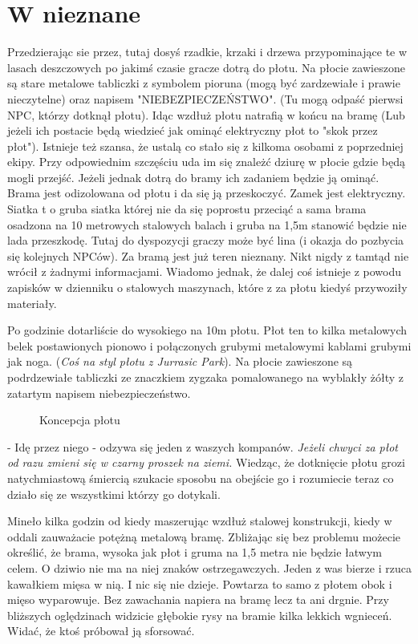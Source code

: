 \documentclass{article}
\begin{document}
    \section{W nieznane}

    Przedzierając sie przez, tutaj dosyś rzadkie, krzaki i drzewa przypominające te w lasach deszczowych po jakimś czasie gracze dotrą do płotu. Na płocie zawieszone są stare metalowe tabliczki z symbolem pioruna (mogą być zardzewiałe i prawie nieczytelne) oraz napisem "NIEBEZPIECZEŃSTWO". (Tu mogą odpaść pierwsi NPC, którzy dotknął płotu). Idąc wzdłuż płotu natrafią w końcu na bramę (Lub jeżeli ich postacie będą wiedzieć jak ominąć elektryczny płot to "skok przez płot"). Istnieje też szansa, że ustalą co stało się z kilkoma osobami z poprzedniej ekipy. Przy odpowiednim szczęściu uda im się znależć dziurę w płocie gdzie będą mogli przejść. Jeżeli jednak dotrą do bramy ich zadaniem będzie ją ominąć. Brama jest odizolowana od płotu i da się ją przeskoczyć. Zamek jest elektryczny. Siatka t o gruba siatka której nie da się poprostu przeciąć a sama brama osadzona na 10 metrowych stalowych balach i gruba na 1,5m stanowić będzie nie lada przeszkodę. Tutaj do dyspozycji graczy może być lina (i okazja do pozbycia się kolejnych NPCów). Za bramą jest już teren nieznany. Nikt nigdy z tamtąd nie wrócił z żadnymi informacjami. Wiadomo jednak, że dalej coś istnieje z powodu zapisków w dzienniku o stalowych maszynach, które z za płotu kiedyś przywoziły materiały.

    \normalfont
    Po godzinie dotarliście do wysokiego na 10m płotu. Płot ten to kilka metalowych belek postawionych pionowo i połączonych grubymi metalowymi kablami grubymi jak noga. (\emph{Coś na styl płotu z Jurrasic Park}). Na płocie zawieszone są podrdzewiałe tabliczki ze znaczkiem zygzaka pomalowanego na wyblakły żółty z zatartym napisem niebezpieczeństwo. 

    \begin{figure}
        \centering
        \def\svgwidth{\columnwidth}
        
        \caption{Koncepcja płotu}
    \end{figure}

    - Idę przez niego - odzywa się jeden z waszych kompanów. \emph{Jeżeli chwyci za płot od razu zmieni się w czarny proszek na ziemi.} Wiedząc, że dotknięcie płotu grozi natychmiastową śmiercią szukacie sposobu na obejście go i rozumiecie teraz co działo się ze wszystkimi którzy go dotykali.



    Mineło kilka godzin od kiedy maszerując wzdłuż stalowej konstrukcji, kiedy w oddali zauważacie potężną metalową bramę. Zbliżając się bez problemu możecie określić, że brama, wysoka jak płot i gruma na 1,5 metra nie będzie łatwym celem. O dziwio nie ma na niej znaków ostrzegawczych. Jeden z was bierze i rzuca kawałkiem mięsa w nią. I nic się nie dzieje. Powtarza to samo z płotem obok i mięso wyparowuje. Bez zawachania napiera na bramę lecz ta ani drgnie. Przy bliższych oględzinach widzicie głębokie rysy na bramie kilka lekkich wgnieceń. Widać, że ktoś próbował ją sforsować.
\end{document}
